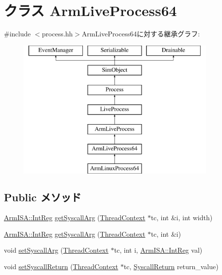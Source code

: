 \hypertarget{classArmLiveProcess64}{
\section{クラス ArmLiveProcess64}
\label{classArmLiveProcess64}
}


{\ttfamily \#include $<$process.hh$>$}ArmLiveProcess64に対する継承グラフ:\begin{figure}[H]
\begin{center}
\leavevmode
\includegraphics[height=7cm]{classArmLiveProcess64}
\end{center}
\end{figure}
\subsection*{Public メソッド}
\begin{DoxyCompactItemize}
\item 
\hyperlink{namespaceArmISA_a0e080577527fb3e9685399f75b5caf15}{ArmISA::IntReg} \hyperlink{classArmLiveProcess64_a52c7542cca5e7218361e5d1baf236cb2}{getSyscallArg} (\hyperlink{classThreadContext}{ThreadContext} $\ast$tc, int \&i, int width)
\item 
\hyperlink{namespaceArmISA_a0e080577527fb3e9685399f75b5caf15}{ArmISA::IntReg} \hyperlink{classArmLiveProcess64_acd6c1a25855e6ca42789dd97c86a17ac}{getSyscallArg} (\hyperlink{classThreadContext}{ThreadContext} $\ast$tc, int \&i)
\item 
void \hyperlink{classArmLiveProcess64_addce5483f248b617812cb55b7e58ffd0}{setSyscallArg} (\hyperlink{classThreadContext}{ThreadContext} $\ast$tc, int i, \hyperlink{namespaceArmISA_a0e080577527fb3e9685399f75b5caf15}{ArmISA::IntReg} val)
\item 
void \hyperlink{classArmLiveProcess64_aaefd02663c1eae206b851290d9276a5e}{setSyscallReturn} (\hyperlink{classThreadContext}{ThreadContext} $\ast$tc, \hyperlink{classSyscallReturn}{SyscallReturn} return\_\-value)
\end{DoxyCompactItemize}

